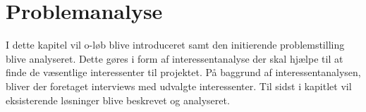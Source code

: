 \chapter{Problemanalyse}
I dette kapitel vil o-løb blive introduceret samt den initierende problemstilling blive analyseret. Dette gøres i form af interessentanalyse der skal hjælpe til at finde de væsentlige interessenter til projektet. På baggrund af interessentanalysen, bliver der foretaget interviews med udvalgte interessenter. Til sidst i kapitlet vil eksisterende løsninger blive beskrevet og analyseret.